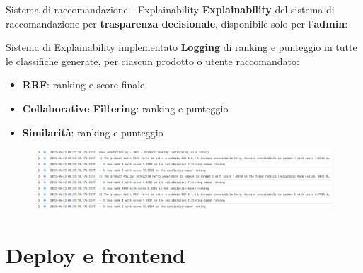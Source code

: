 \documentclass{beamer}
\begin{document}
	\begin{frame}{Sistema di raccomandazione - Explainability}
		\textbf{Explainability} del sistema di raccomandazione per \textbf{trasparenza decisionale}, disponibile solo per l'\textbf{admin}:

		\begin{alertblock}{Sistema di Explainability implementato}
			\textbf{Logging} di ranking e punteggio in tutte le classifiche generate, per ciascun prodotto o utente raccomandato:
			\begin{itemize}
				\item \textbf{RRF}: ranking e score finale
				\item \textbf{Collaborative Filtering}: ranking e punteggio
				\item \textbf{Similarità}: ranking e punteggio
			\end{itemize}
		\end{alertblock}

		\begin{figure}
			\centering
			\includegraphics[width=\textwidth]{Explainability - Log della task Recommendation System.png}
		\end{figure}
	\end{frame}


	\section{Deploy e frontend}
\end{document}
